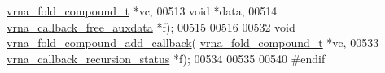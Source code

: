\begin{DoxyCode}
      \hyperlink{group__fold__compound_structvrna__fc__s}{vrna\_fold\_compound\_t}        *vc,
00513                                     \textcolor{keywordtype}{void}                        *data,
00514                                     \hyperlink{group__fold__compound_ga7806651f51b195013839a218b3bbd5a3}{vrna\_callback\_free\_auxdata}  *f);
00515 
00516 
00532 \textcolor{keywordtype}{void} \hyperlink{group__fold__compound_ga097ed6133055624667cbce8cfdebf82d}{vrna\_fold\_compound\_add\_callback}(
      \hyperlink{group__fold__compound_structvrna__fc__s}{vrna\_fold\_compound\_t}           *vc,
00533                                      \hyperlink{group__fold__compound_gac86036fa8cad1108832335063243cdc8}{vrna\_callback\_recursion\_status} *f);
00534 
00535 
00540 \textcolor{preprocessor}{#endif}
\end{DoxyCode}
